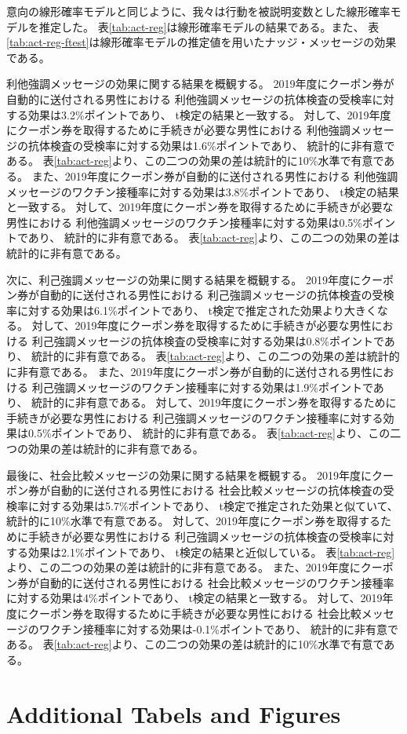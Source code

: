 \documentclass[
  11pt,
  a4paper,
]{article}
\begin{document}
意向の線形確率モデルと同じように、我々は行動を被説明変数とした線形確率モデルを推定した。
表\ref{tab:act-reg}は線形確率モデルの結果である。また、
表\ref{tab:act-reg-ftest}は線形確率モデルの推定値を用いたナッジ・メッセージの効果である。

利他強調メッセージの効果に関する結果を概観する。
2019年度にクーポン券が自動的に送付される男性における
利他強調メッセージの抗体検査の受検率に対する効果は3.2\%ポイントであり、
t検定の結果と一致する。
対して、2019年度にクーポン券を取得するために手続きが必要な男性における
利他強調メッセージの抗体検査の受検率に対する効果は1.6\%ポイントであり、
統計的に非有意である。
表\ref{tab:act-reg}より、この二つの効果の差は統計的に10\%水準で有意である。
また、2019年度にクーポン券が自動的に送付される男性における
利他強調メッセージのワクチン接種率に対する効果は3.8\%ポイントであり、
t検定の結果と一致する。
対して、2019年度にクーポン券を取得するために手続きが必要な男性における
利他強調メッセージのワクチン接種率に対する効果は0.5\%ポイントであり、
統計的に非有意である。
表\ref{tab:act-reg}より、この二つの効果の差は統計的に非有意である。

次に、利己強調メッセージの効果に関する結果を概観する。
2019年度にクーポン券が自動的に送付される男性における
利己強調メッセージの抗体検査の受検率に対する効果は6.1\%ポイントであり、
t検定で推定された効果より大きくなる。
対して、2019年度にクーポン券を取得するために手続きが必要な男性における
利己強調メッセージの抗体検査の受検率に対する効果は0.8\%ポイントであり、
統計的に非有意である。
表\ref{tab:act-reg}より、この二つの効果の差は統計的に非有意である。
また、2019年度にクーポン券が自動的に送付される男性における
利己強調メッセージのワクチン接種率に対する効果は1.9\%ポイントであり、
統計的に非有意である。
対して、2019年度にクーポン券を取得するために手続きが必要な男性における
利己強調メッセージのワクチン接種率に対する効果は0.5\%ポイントであり、
統計的に非有意である。
表\ref{tab:act-reg}より、この二つの効果の差は統計的に非有意である。

最後に、社会比較メッセージの効果に関する結果を概観する。
2019年度にクーポン券が自動的に送付される男性における
社会比較メッセージの抗体検査の受検率に対する効果は5.7\%ポイントであり、
t検定で推定された効果と似ていて、統計的に10\%水準で有意である。
対して、2019年度にクーポン券を取得するために手続きが必要な男性における
利己強調メッセージの抗体検査の受検率に対する効果は2.1\%ポイントであり、
t検定の結果と近似している。
表\ref{tab:act-reg}より、この二つの効果の差は統計的に非有意である。
また、2019年度にクーポン券が自動的に送付される男性における
社会比較メッセージのワクチン接種率に対する効果は4\%ポイントであり、
t検定の結果と一致する。
対して、2019年度にクーポン券を取得するために手続きが必要な男性における
社会比較メッセージのワクチン接種率に対する効果は-0.1\%ポイントであり、
統計的に非有意である。
表\ref{tab:act-reg}より、この二つの効果の差は統計的に10\%水準で有意である。

\hypertarget{additional-tabels-and-figures}{%
\section{Additional Tabels and Figures}\label{additional-tabels-and-figures}}
\end{document}
